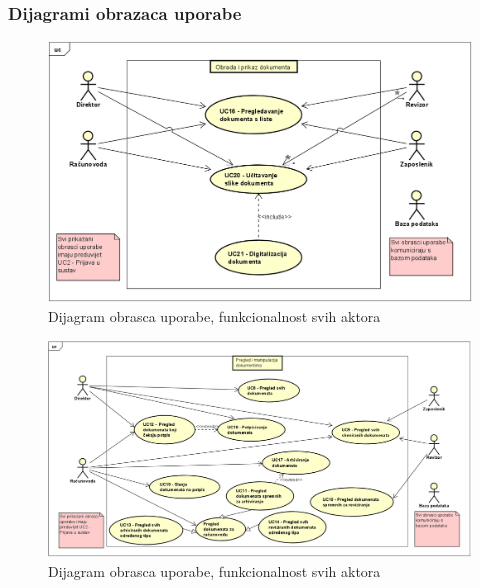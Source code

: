 				\clearpage
					
				\subsubsection{Dijagrami obrazaca uporabe}
					
					\begin{figure}[H]
						\includegraphics[width=\textwidth]{slike/3.1.1 dijagrami/ObradaIPrikazDokumenata.PNG}
						\caption{Dijagram obrasca uporabe, funkcionalnost svih aktora}
						\label{fig:UC21} 
					\end{figure}
					
					\begin{figure}[H]
						\includegraphics[width=\textwidth]{slike/3.1.1 dijagrami/PregledIManipulacijaDokumentima_v2.PNG}
						\caption{Dijagram obrasca uporabe, funkcionalnost svih aktora}
						\label{fig:UC21} 
					\end{figure}
					

